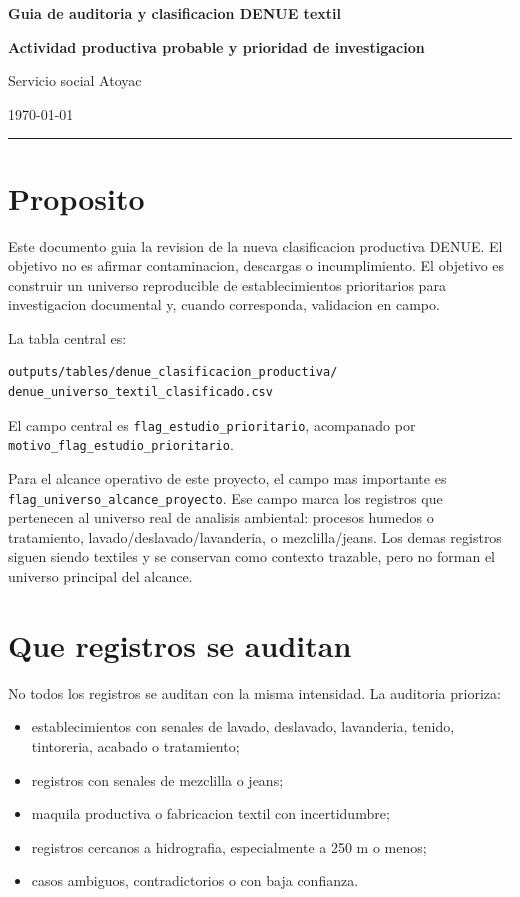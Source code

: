 \documentclass[11pt,letterpaper]{article}
\begin{document}
{\centering
{\Huge\bfseries\color{AtoyacBlue} Guia de auditoria y clasificacion DENUE textil\par}
{\Large\bfseries Actividad productiva probable y prioridad de investigacion\par}
\vspace{0.8em}
{\large Servicio social Atoyac\par}
{\normalsize \today\par}
\vspace{1em}
}
\hrule
\vspace{1em}

\section{Proposito}

Este documento guia la revision de la nueva clasificacion productiva DENUE. El objetivo no es afirmar contaminacion, descargas o incumplimiento. El objetivo es construir un universo reproducible de establecimientos prioritarios para investigacion documental y, cuando corresponda, validacion en campo.

La tabla central es:

\begin{verbatim}
outputs/tables/denue_clasificacion_productiva/
denue_universo_textil_clasificado.csv
\end{verbatim}

El campo central es \texttt{flag\_estudio\_prioritario}, acompanado por \texttt{motivo\_flag\_estudio\_prioritario}.

Para el alcance operativo de este proyecto, el campo mas importante es \texttt{flag\_universo\_alcance\_proyecto}. Ese campo marca los registros que pertenecen al universo real de analisis ambiental: procesos humedos o tratamiento, lavado/deslavado/lavanderia, o mezclilla/jeans. Los demas registros siguen siendo textiles y se conservan como contexto trazable, pero no forman el universo principal del alcance.

\section{Que registros se auditan}

No todos los registros se auditan con la misma intensidad. La auditoria prioriza:

\begin{itemize}
  \item establecimientos con senales de lavado, deslavado, lavanderia, tenido, tintoreria, acabado o tratamiento;
  \item registros con senales de mezclilla o jeans;
  \item maquila productiva o fabricacion textil con incertidumbre;
  \item registros cercanos a hidrografia, especialmente a 250 m o menos;
  \item casos ambiguos, contradictorios o con baja confianza.
\end{itemize}
\end{document}
